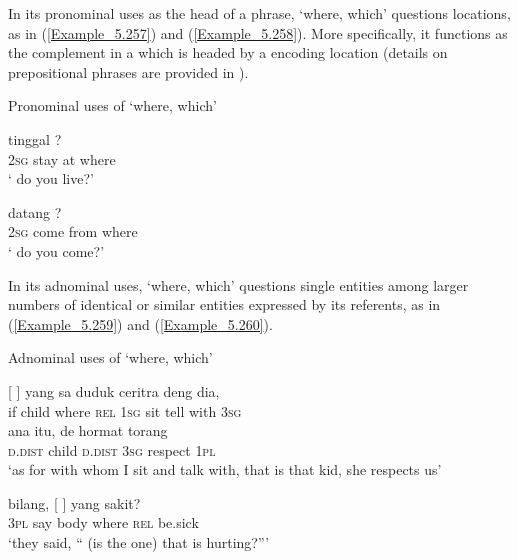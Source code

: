 In its pronominal uses as the head of a  phrase,  ‘where, which’ questions locations, as in (\ref{Example_5.257}) and (\ref{Example_5.258}). More specifically, it functions as the complement in a  which is headed by a  encoding location (details on prepositional phrases are provided in ).


\begin{styleExampleTitle}
Pronominal uses of  ‘where, which’
\end{styleExampleTitle}

\ea
\label{Example_5.257}
 {tinggal} {} {?}\\ %
 \textsc{2sg}  stay  at  where\\
\glt 
‘ do you live?’ \textstyleExampleSource{[080922-010a-CvNF.0237]}
\z

\ea
\label{Example_5.258}
 {datang} {} {?}\\ %
 \textsc{2sg}  come  from  where\\
\glt 
‘ do you come?’ \textstyleExampleSource{[080922-010a-CvNF.0236]}
\z


In its adnominal uses,  ‘where, which’ questions single entities among larger numbers of identical or similar entities expressed by its referents, as in (\ref{Example_5.259}) and (\ref{Example_5.260}).


\begin{styleExampleTitle}
Adnominal uses of  ‘where, which’
\end{styleExampleTitle}

\ea
\label{Example_5.259}
 {{[}} {{]}} {{yang}} {{sa}} {{duduk}} {ceritra} {deng} {dia,}\\ %
 if  {child}  {where}  {\textsc{rel}}  {\textsc{1sg}}  {sit}  tell  with  \textsc{3sg}\\
  {ana}  {itu,}  {de}  {hormat}  {torang}\\
 {\textsc{d.dist}}  {child}  {\textsc{d.dist}}  {\textsc{3sg}}  {respect}  {\textsc{1pl}}\\
 ‘as for  with whom I sit and talk with, that is that kid, she respects us’ \textstyleExampleSource{[081115-001a-Cv.0282]}
\z

\ea
\label{Example_5.260}
 {bilang,} {[} {]} {yang} {sakit?}\\ %
 \textsc{3pl}  say  body  where  \textsc{rel}  be.sick\\
\glt 
‘they said, `` (is the one) that is hurting?''' \textstyleExampleSource{[081015-005-NP.0031]}
\z


